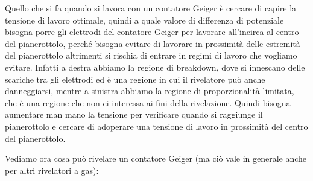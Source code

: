 Quello che si fa quando si lavora con un contatore Geiger è cercare di capire la tensione di lavoro ottimale, quindi a quale valore di differenza di potenziale bisogna porre gli elettrodi del contatore Geiger per lavorare all'incirca al centro del pianerottolo, perché bisogna evitare di lavorare in prossimità delle estremità del pianerottolo altrimenti si rischia di entrare in regimi di lavoro che vogliamo evitare. Infatti a destra abbiamo la regione di breakdown, dove si innescano delle scariche tra gli elettrodi ed è una regione in cui il rivelatore può anche danneggiarsi, mentre a sinistra abbiamo la regione di proporzionalità limitata, che è una regione che non ci interessa ai fini della rivelazione. Quindi bisogna aumentare man mano la tensione per verificare quando si raggiunge il pianerottolo e cercare di adoperare una tensione di lavoro in prossimità del centro del pianerottolo.

\vspace{0.2cm}Vediamo ora cosa può rivelare un contatore Geiger (ma ciò vale in generale anche per altri rivelatori a gas):

